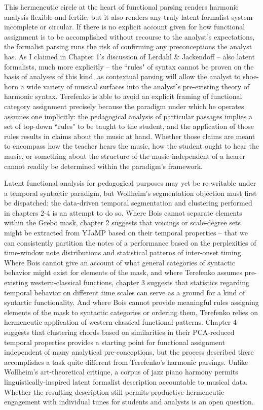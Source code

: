 This hermeneutic circle at the heart of functional parsing renders harmonic analysis flexible and fertile, but it also renders any truly latent formalist system incomplete or circular.  If there is no explicit account given for how functional assignment is to be accomplished without recourse to the analyst's expectations, the formalist parsing runs the risk of confirming any preconceptions the analyst has.  As I claimed in Chapter 1's discussion of Lerdahl \& Jackendoff -- also latent formalists, much more explicitly -- the ``rules" of syntax cannot be proven on the basis of analyses of this kind, as contextual parsing will allow the analyst to shoe-horn a wide variety of musical surfaces into the analyst's pre-existing theory of harmonic syntax.  Terefenko is able to avoid an explicit framing of functional category assignment precisely because the paradigm under which he operates assumes one implicitly: the pedagogical analysis of particular passages implies a set of top-down ``rules" to be taught to the student, and the application of those rules results in claims about the music at hand.  Whether those claims are meant to encompass how the teacher hears the music, how the student ought to hear the music, or something about the structure of the music independent of a hearer cannot readily be determined within the paradigm's framework.%

Latent functional analysis for pedagogical purposes may yet be re-writable under a temporal syntactic paradigm, but Wollheim's segmentation objection must first be dispatched: the data-driven temporal segmentation and clustering performed in chapters 2-4 is an attempt to do so.  Where Bois cannot separate elements within the Grebo mask, chapter 2 suggests that voicings or scale-degree sets might be extracted from YJaMP based on their temporal properties -- that we can consistently partition the notes of a performance based on the perplexities of time-window note distributions and statistical patterns of inter-onset timing.  Where Bois cannot give an account of what general categories of syntactic behavior might exist for elements of the mask, and where Terefenko assumes pre-existing western-classical functions, chapter 3 suggests that statistics regarding temporal behavior on different time scales can serve as a ground for a kind of syntactic functionality.  And where Bois cannot provide meaningful rules assigning elements of the mask to syntactic categories or ordering them, Terefenko relies on hermeneutic application of western-classical functional patterns.  Chapter 4 suggests that clustering chords based on similarities in their PCA-reduced temporal properties provides a starting point for functional assignment independent of many analytical pre-conceptions, but the process described there accomplishes a task quite different from  Terefenko's harmonic parsings.  Unlike Wollheim's art-theoretical critique, a corpus of jazz piano harmony permits linguistically-inspired latent formalist description accountable to musical data.  Whether the resulting description still permits productive hermeneutic engagement with individual tunes for students and analysts is an open question.

